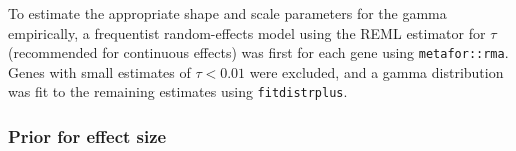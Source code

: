To estimate the appropriate shape and scale parameters for the gamma empirically, a frequentist random-effects model using the \gls{REML} estimator for $\tau$ (recommended for continuous effects\autocite{veroniki2016MethodsEstimateBetweenstudy}) was first for each gene using \texttt{metafor::rma}.
Genes with small estimates of $\tau < 0.01$ were excluded, and a gamma distribution was fit to the remaining estimates using \texttt{fitdistrplus}.

\subsubsection{Prior for effect size}

